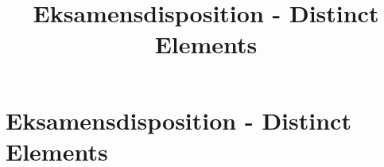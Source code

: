 
\title{Eksamensdisposition - Distinct Elements}


\maketitle



\newpage
\section{Eksamensdisposition - Distinct Elements}







